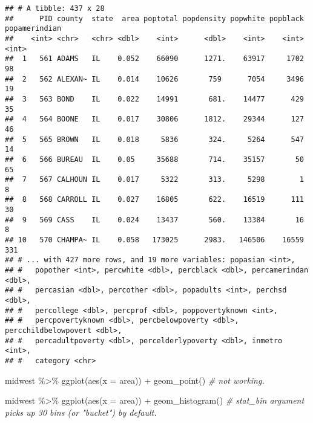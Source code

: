 \documentclass[
]{book}
\newenvironment{Shaded}{\begin{snugshade}}{\end{snugshade}}
\newcommand{\AttributeTok}[1]{\textcolor[rgb]{0.77,0.63,0.00}{#1}}
\newcommand{\CommentTok}[1]{\textcolor[rgb]{0.56,0.35,0.01}{\textit{#1}}}
\newcommand{\FunctionTok}[1]{\textcolor[rgb]{0.00,0.00,0.00}{#1}}
\newcommand{\NormalTok}[1]{#1}
\newcommand{\SpecialCharTok}[1]{\textcolor[rgb]{0.00,0.00,0.00}{#1}}
\begin{document}
\begin{verbatim}
## # A tibble: 437 x 28
##      PID county  state  area poptotal popdensity popwhite popblack popamerindian
##    <int> <chr>   <chr> <dbl>    <int>      <dbl>    <int>    <int>         <int>
##  1   561 ADAMS   IL    0.052    66090      1271.    63917     1702            98
##  2   562 ALEXAN~ IL    0.014    10626       759      7054     3496            19
##  3   563 BOND    IL    0.022    14991       681.    14477      429            35
##  4   564 BOONE   IL    0.017    30806      1812.    29344      127            46
##  5   565 BROWN   IL    0.018     5836       324.     5264      547            14
##  6   566 BUREAU  IL    0.05     35688       714.    35157       50            65
##  7   567 CALHOUN IL    0.017     5322       313.     5298        1             8
##  8   568 CARROLL IL    0.027    16805       622.    16519      111            30
##  9   569 CASS    IL    0.024    13437       560.    13384       16             8
## 10   570 CHAMPA~ IL    0.058   173025      2983.   146506    16559           331
## # ... with 427 more rows, and 19 more variables: popasian <int>,
## #   popother <int>, percwhite <dbl>, percblack <dbl>, percamerindan <dbl>,
## #   percasian <dbl>, percother <dbl>, popadults <int>, perchsd <dbl>,
## #   percollege <dbl>, percprof <dbl>, poppovertyknown <int>,
## #   percpovertyknown <dbl>, percbelowpoverty <dbl>, percchildbelowpovert <dbl>,
## #   percadultpoverty <dbl>, percelderlypoverty <dbl>, inmetro <int>,
## #   category <chr>
\end{verbatim}

\begin{Shaded}
\begin{Highlighting}[]
\NormalTok{midwest }\SpecialCharTok{\%\textgreater{}\%}
  \FunctionTok{ggplot}\NormalTok{(}\FunctionTok{aes}\NormalTok{(}\AttributeTok{x =}\NormalTok{ area)) }\SpecialCharTok{+}
  \FunctionTok{geom\_point}\NormalTok{() }\CommentTok{\# not working.}
\end{Highlighting}
\end{Shaded}

\begin{Shaded}
\begin{Highlighting}[]
\NormalTok{midwest }\SpecialCharTok{\%\textgreater{}\%}
  \FunctionTok{ggplot}\NormalTok{(}\FunctionTok{aes}\NormalTok{(}\AttributeTok{x =}\NormalTok{ area)) }\SpecialCharTok{+}
  \FunctionTok{geom\_histogram}\NormalTok{() }\CommentTok{\# stat\_bin argument picks up 30 bins (or "bucket") by default.}
\end{Highlighting}
\end{Shaded}
\end{document}
